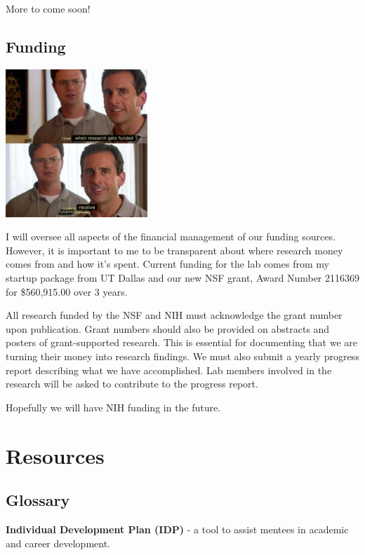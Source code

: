 \documentclass[
]{book}
\begin{document}
More to come soon!

\hypertarget{funding}{%
\section{Funding}\label{funding}}

\includegraphics[width=0.4\textwidth,height=\textheight]{images/inside_joke_funding.jpg}

I will oversee all aspects of the financial management of our funding sources. However, it is important to me to be transparent about where research money comes from and how it's spent. Current funding for the lab comes from my startup package from UT Dallas and our new NSF grant, Award Number 2116369 for \$560,915.00 over 3 years.

All research funded by the NSF and NIH must acknowledge the grant number upon publication. Grant numbers should also be provided on abstracts and posters of grant-supported research. This is essential for documenting that we are turning their money into research findings. We must also submit a yearly progress report describing what we have accomplished. Lab members involved in the research will be asked to contribute to the progress report.

Hopefully we will have NIH funding in the future.

\hypertarget{resources}{%
\chapter{Resources}\label{resources}}

\hypertarget{glossary}{%
\section{Glossary}\label{glossary}}

\textbf{Individual Development Plan (IDP)} - a tool to assist mentees in academic and career development.
\end{document}
